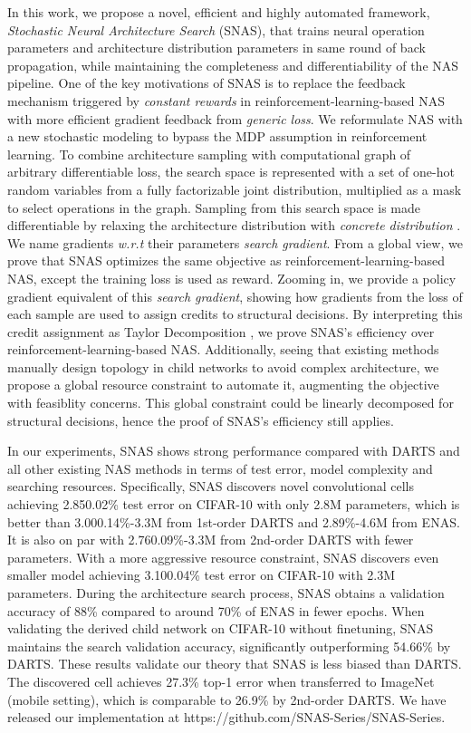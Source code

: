 \documentclass{article} \usepackage{iclr2019_conference,times}
\newcommand{\zh}{\color{black}}
\begin{document}
In this work, we propose a novel, efficient and highly automated framework, \textit{Stochastic Neural Architecture Search} (SNAS), that trains neural operation parameters and architecture distribution parameters in same round of back propagation, while maintaining the completeness and {\zh differentiability} of the NAS pipeline. One of the key motivations of SNAS is to replace the feedback mechanism triggered by \textit{constant rewards} in reinforcement-learning-based NAS with more efficient gradient feedback from \textit{generic loss}. We reformulate NAS with a new stochastic modeling to bypass the MDP assumption in reinforcement learning. To combine architecture sampling with computational graph of arbitrary differentiable loss, the search space is represented with a set of one-hot random variables from a fully factorizable joint distribution, multiplied as a mask to select operations in the graph. Sampling from this search space is made differentiable by relaxing the architecture distribution with \textit{concrete distribution} \citep{maddison2016concrete}. We name gradients \textit{w.r.t} their parameters \textit{search gradient}. From a global view, we prove that SNAS optimizes the same objective as reinforcement-learning-based NAS, except the training loss is used as reward. Zooming in, we provide a policy gradient equivalent of this \textit{search gradient}, showing how gradients from the loss of each sample {\zh are} used to assign credits to structural decisions. By interpreting this credit assignment as Taylor Decomposition \citep{montavon2017explaining}, we prove SNAS's efficiency over reinforcement-learning-based NAS. Additionally, seeing that existing methods \citep{liu2018darts} manually design topology in child networks to avoid complex architecture, we propose a global resource constraint to automate it, augmenting the objective with feasiblity concerns. This global constraint could be linearly decomposed for structural decisions, hence the proof of SNAS's efficiency still applies.

In our experiments, SNAS shows strong performance compared with DARTS and all other existing NAS methods in terms of test error, model complexity and searching resources. Specifically, SNAS discovers novel convolutional cells achieving 2.850.02\% test error on CIFAR-10 with only 2.8M parameters, which is better than 3.000.14\%-3.3M from 1st-order DARTS and 2.89\%-4.6M from ENAS. It is also on par with 2.760.09\%-3.3M from 2nd-order DARTS with {\zh fewer} parameters. With a more aggressive resource constraint, SNAS discovers even smaller model achieving {\zh 3.100.04\%} test error on CIFAR-10 with 2.3M parameters. During the architecture search process, SNAS obtains a validation accuracy of 88\% compared to around 70\% of ENAS in {\zh fewer} epochs. When validating the derived child network on CIFAR-10 without finetuning, SNAS maintains the search validation accuracy, significantly outperforming 54.66\% by DARTS. These results validate our theory that SNAS is less biased than DARTS. The discovered cell achieves 27.3\% top-1 error when transferred to ImageNet (mobile setting), which is comparable to 26.9\% by 2nd-order DARTS. We have released our implementation at https://github.com/SNAS-Series/SNAS-Series. 
\end{document}
